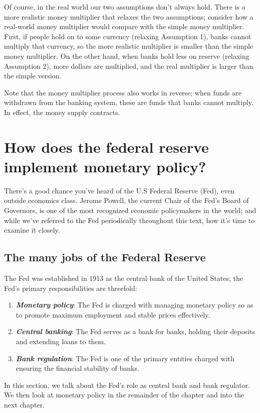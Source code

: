 \documentclass[11pt]{article} %
\begin{document}
Of course, in the real world our two assumptions don't always hold. There is a more realistic money multiplier that relaxes the two assumptions; consider how a real-world money multiplier would compare with the simple money multiplier. First, if people hold on to some currency (relaxing Assumption 1), banks cannot multiply that currency, so the more realistic multiplier is smaller than the simple money multiplier. On the other hand, when banks hold less on reserve (relaxing Assumption 2), more dollars are multiplied, and the real multiplier is larger than the simple version.

Note that the money multiplier process also works in reverse; when funds are withdrawn from the banking system, these are funds that banks cannot multiply. In effect, the money supply contracts.

\section*{How does the federal reserve implement monetary policy?}
There's a good chance you've heard of the U.S Federal Reserve (Fed), even outside economics class. Jerome Powell, the current Chair of the Fed's Board of Governors, is one of the most recognized economic policymakers in the world; and while we've referred to the Fed periodically throughout this text, how it's time to examine it closely.

\subsection*{The many jobs of the Federal Reserve}
The Fed was established in 1913 as the central bank of the United States; the Fed's primary responsibilities are threefold:
\begin{enumerate}
\item \textit{\textbf{Monetary policy}}: The Fed is charged with managing monetary policy so as to promote maximum employment and stable prices effectively.
\item \textit{\textbf{Central banking}}: The Fed serves as a bank for banks, holding their deposits and extending loans to them.
\item \textit{\textbf{Bank regulation}}: The Fed is one of the primary entities charged with ensuring the financial stability of banks.
\end{enumerate} 
In this section, we talk about the Fed's role as central bank and bank regulator. We then look at monetary policy in the remainder of the chapter and into the next chapter.
\end{document}
